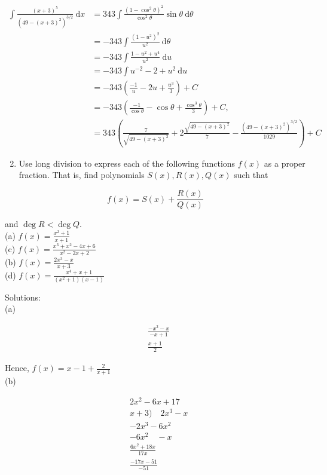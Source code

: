 \documentclass[10pt]{article}
\begin{document}
$$
\begin{aligned}
\int \frac{(x+3)^{5}}{\left(49-(x+3)^{2}\right)^{3 / 2}} \mathrm{~d} x & =343 \int \frac{\left(1-\cos ^{2} \theta\right)^{2}}{\cos ^{2} \theta} \sin \theta \mathrm{~d} \theta \\
& =-343 \int \frac{\left(1-u^{2}\right)^{2}}{u^{2}} \mathrm{~d} \theta \\
& =-343 \int \frac{1-u^{2}+u^{4}}{u^{2}} \mathrm{~d} u \\
& =-343 \int u^{-2}-2+u^{2} \mathrm{~d} u \\
& =-343\left(\frac{-1}{u}-2 u+\frac{u^{3}}{3}\right)+C \\
& =-343\left(\frac{-1}{\cos \theta}-\cos \theta+\frac{\cos ^{3} \theta}{3}\right)+C, \\
& =343\left(\frac{7}{\sqrt{49-(x+3)^{2}}}+2 \frac{\sqrt{49-(x+3)^{2}}}{7}-\frac{\left(49-(x+3)^{2}\right)^{3 / 2}}{1029}\right)+C
\end{aligned}
$$

\begin{enumerate}
  \setcounter{enumi}{1}
  \item Use long division to express each of the following functions $f(x)$ as a proper fraction. That is, find polynomials $S(x), R(x), Q(x)$ such that
\end{enumerate}

$$
f(x)=S(x)+\frac{R(x)}{Q(x)}
$$

and $\operatorname{deg} R<\operatorname{deg} Q$.\\
(a) $f(x)=\frac{x^{2}+1}{x+1}$\\
(c) $f(x)=\frac{x^{3}+x^{2}-4 x+6}{x^{2}-2 x+2}$\\
(b) $f(x)=\frac{2 x^{3}-x}{x+3}$\\
(d) $f(x)=\frac{x^{4}+x+1}{\left(x^{2}+1\right)(x-1)}$

Solutions:\\
(a)

$$
\begin{aligned}
& \frac{-x^{2}-x}{-x+1} \\
& \frac{x+1}{2}
\end{aligned}
$$

Hence, $f(x)=x-1+\frac{2}{x+1}$\\
(b)

$$
\begin{aligned}
& 2 x^{2}-6 x+17 \\
& x+3) \quad 2 x^{3}-x \\
& -2 x^{3}-6 x^{2} \\
& -6 x^{2} \quad-x \\
& \frac{6 x^{2}+18 x}{17 x} \\
& \frac{-17 x-51}{-51}
\end{aligned}
$$
\end{document}
